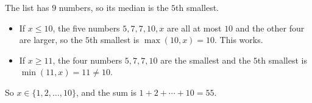 The list has $9$ numbers, so its median is the $5$th smallest.
\begin{itemize}
\item If $x\le10$, the five numbers $5,7,7,10,x$ are all at most $10$ and the other four are larger, so the $5$th smallest is $\max(10,x)=10$. This works.
\item If $x\ge11$, the four numbers $5,7,7,10$ are the smallest and the $5$th smallest is $\min(11,x)=11\ne10$.
\end{itemize}
So $x\in\{1,2,\ldots,10\}$, and the sum is $1+2+\cdots+10=\boxed{55}$.
